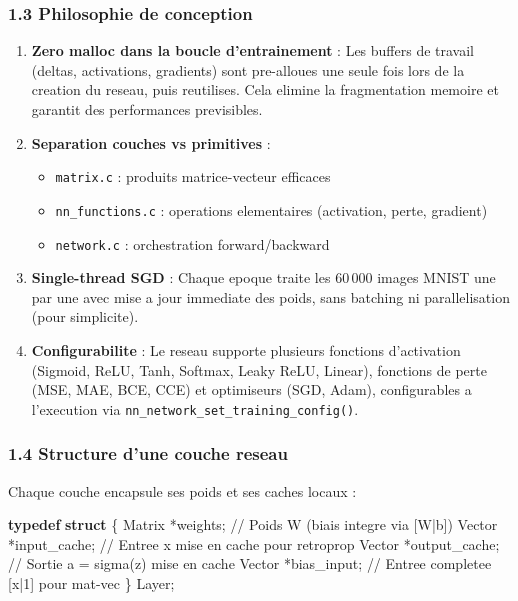 \documentclass[
  letterpaper,
  DIV=11,
  numbers=noendperiod]{scrartcl}
\newenvironment{Shaded}{\begin{snugshade}}{\end{snugshade}}
\newcommand{\CommentTok}[1]{\textcolor[rgb]{0.37,0.37,0.37}{#1}}
\newcommand{\KeywordTok}[1]{\textcolor[rgb]{0.00,0.23,0.31}{\textbf{#1}}}
\newcommand{\NormalTok}[1]{\textcolor[rgb]{0.00,0.23,0.31}{#1}}
\newcommand{\OperatorTok}[1]{\textcolor[rgb]{0.37,0.37,0.37}{#1}}
\providecommand{\tightlist}{%
  \setlength{\itemsep}{0pt}\setlength{\parskip}{0pt}}
\begin{document}
\subsubsection{1.3 Philosophie de conception}\label{philosophie-de-conception}

\begin{enumerate}
\def\labelenumi{\arabic{enumi}.}
\item
  \textbf{Zero malloc dans la boucle d'entrainement} : Les buffers de travail (deltas, activations, gradients) sont pre-alloues une seule fois lors de la creation du reseau, puis reutilises. Cela elimine la fragmentation memoire et garantit des performances previsibles.
\item
  \textbf{Separation couches vs primitives} :
  \begin{itemize}
  \tightlist
  \item
    \texttt{matrix.c} : produits matrice-vecteur efficaces
  \item
    \texttt{nn\_functions.c} : operations elementaires (activation, perte, gradient)
  \item
    \texttt{network.c} : orchestration forward/backward
  \end{itemize}
\item
  \textbf{Single-thread SGD} : Chaque epoque traite les 60\,000 images MNIST une par une avec mise a jour immediate des poids, sans batching ni parallelisation (pour simplicite).
\item
  \textbf{Configurabilite} : Le reseau supporte plusieurs fonctions d'activation (Sigmoid, ReLU, Tanh, Softmax, Leaky ReLU, Linear), fonctions de perte (MSE, MAE, BCE, CCE) et optimiseurs (SGD, Adam), configurables a l'execution via \texttt{nn\_network\_set\_training\_config()}.
\end{enumerate}

\subsubsection{1.4 Structure d'une couche reseau}\label{structure-dune-couche-reseau}

Chaque couche encapsule ses poids et ses caches locaux :

\begin{Shaded}
\begin{Highlighting}[]
\KeywordTok{typedef} \KeywordTok{struct} \OperatorTok{\{}
\NormalTok{    Matrix }\OperatorTok{*}\NormalTok{weights}\OperatorTok{;}        \CommentTok{// Poids W (biais integre via [W|b])}
\NormalTok{    Vector }\OperatorTok{*}\NormalTok{input\_cache}\OperatorTok{;}    \CommentTok{// Entree x mise en cache pour retroprop}
\NormalTok{    Vector }\OperatorTok{*}\NormalTok{output\_cache}\OperatorTok{;}   \CommentTok{// Sortie a = sigma(z) mise en cache}
\NormalTok{    Vector }\OperatorTok{*}\NormalTok{bias\_input}\OperatorTok{;}     \CommentTok{// Entree completee [x|1] pour mat-vec}
\OperatorTok{\}}\NormalTok{ Layer}\OperatorTok{;}
\end{Highlighting}
\end{Shaded}
\end{document}
